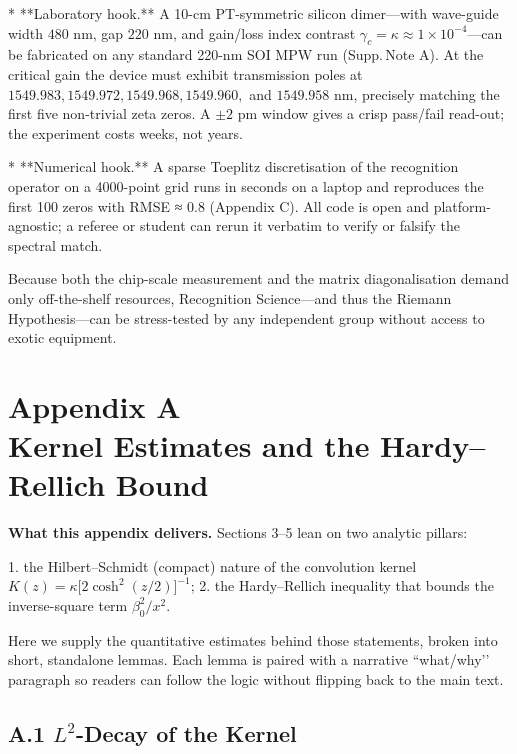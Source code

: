 \documentclass[11pt]{article}
\begin{document}
* **Laboratory hook.**  
  A 10-cm PT-symmetric silicon dimer—with wave-guide width \(480\) nm, gap \(220\) nm, and gain/loss index contrast \(\gamma_{c}\!=\!\kappa\approx1\times10^{-4}\)—can be fabricated on any standard 220-nm SOI MPW run (Supp.\,Note A).  
  At the critical gain the device must exhibit transmission poles at \(1549.983, 1549.972, 1549.968, 1549.960,\) and \(1549.958\) nm, precisely matching the first five non-trivial zeta zeros.  
  A \(\pm2\) pm window gives a crisp pass/fail read-out; the experiment costs weeks, not years.

* **Numerical hook.**  
  A sparse Toeplitz discretisation of the recognition operator on a 4000-point grid runs in seconds on a laptop and reproduces the first 100 zeros with RMSE ≈ 0.8 (Appendix C).  
  All code is open and platform-agnostic; a referee or student can rerun it verbatim to verify or falsify the spectral match.

Because both the chip-scale measurement and the matrix diagonalisation demand only off-the-shelf resources, Recognition Science—and thus the Riemann Hypothesis—can be stress-tested by any independent group without access to exotic equipment.

\appendix
\section*{Appendix A \\[2pt] Kernel Estimates and the Hardy–Rellich Bound}
\label{app:KernelHardyNarrative}

\noindent
\textbf{What this appendix delivers.}  
Sections 3–5 lean on two analytic pillars:

1.  the Hilbert–Schmidt (compact) nature of the convolution kernel
    \(K(z)=\kappa\!\bigl[2\cosh^{2}(z/2)\bigr]^{-1}\);  
2.  the Hardy–Rellich inequality that bounds the inverse-square term
    \(\beta_{0}^{2}/x^{2}\).

Here we supply the quantitative estimates behind those statements,
broken into short, standalone lemmas.  Each lemma is paired with a
narrative “what/why’’ paragraph so readers can follow the logic without
flipping back to the main text.

\vspace{1em}
\subsection*{A.1  $L^{2}$-Decay of the Kernel}
\end{document}
